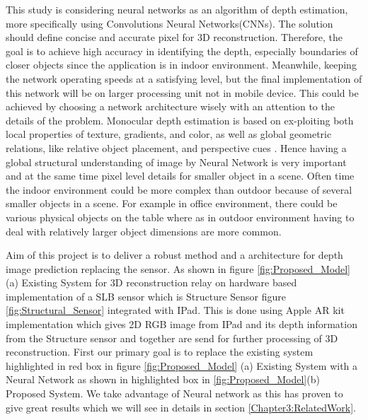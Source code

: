 This study is considering neural networks as an algorithm of depth estimation, more specifically using Convolutions Neural Networks(CNNs). The solution should define concise and accurate pixel for 3D reconstruction. Therefore, the goal is to achieve high accuracy in identifying the depth, especially boundaries of closer objects since the application is in indoor environment. Meanwhile, keeping the network operating speeds at a satisfying level, but the final implementation of this network will be on larger processing unit not in mobile device. This could be achieved by choosing a network architecture wisely with an attention to the details of the problem. Monocular depth estimation is based on ex-ploiting both local properties of texture, gradients, and color, as well as global geometric relations, like relative object placement, and perspective cues \cite{saxena2006learning}. Hence having a global structural understanding of image by Neural Network is very important and at the same time pixel level details for smaller object in a scene. Often time the indoor environment could be more complex than outdoor because of several smaller objects in a scene. For example in office environment, there could be various physical objects on the table where as in outdoor environment having to deal with relatively larger object dimensions are more common.  

Aim of this project is to deliver a robust method and a architecture for depth image prediction replacing the sensor. As shown in figure \ref{fig:Proposed_Model} (a) Existing System for 3D reconstruction relay on hardware based implementation of a SLB sensor which is Structure Sensor figure \ref{fig:Structural_Sensor} integrated with IPad. This is done using Apple AR kit implementation which gives 2D RGB image from IPad and its depth information from the Structure sensor and together are send for further processing of 3D reconstruction. First our primary goal is to replace the existing system highlighted in red box in figure \ref{fig:Proposed_Model} (a) Existing System with a Neural Network as shown in highlighted box in \ref{fig:Proposed_Model}(b) Proposed System. We take advantage of Neural network as this has proven to give great results which we will see in details in section \ref{Chapter3:RelatedWork}.


